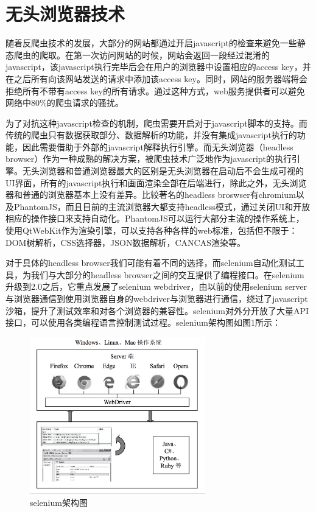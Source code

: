 \documentclass[doctor,privacy,twoside]{buaa_mac}
\begin{document}
\section{无头浏览器技术}
随着反爬虫技术的发展，大部分的网站都通过开启javascript的检查来避免一些静态爬虫的爬取。在第一次访问网站的时候，网站会返回一段经过混淆的javascript，该javascript执行完毕后会在用户的浏览器中设置相应的access key，并在之后所有向该网站发送的请求中添加该access key。同时，网站的服务器端将会拒绝所有不带有access key的所有请求。通过这种方式，web服务提供者可以避免网络中80\%的爬虫请求的骚扰。

为了对抗这种javascript检查的机制，爬虫需要开启对于javascript脚本的支持。而传统的爬虫只有数据获取部分、数据解析的功能，并没有集成javascript执行的功能，因此需要借助于外部的javascript解释执行引擎。而无头浏览器（headless browser）作为一种成熟的解决方案，被爬虫技术广泛地作为javascript的执行引擎。无头浏览器和普通浏览器最大的区别是无头浏览器在启动后不会生成可视的UI界面，所有的javascript执行和画面渲染全部在后端进行，除此之外，无头浏览器和普通的浏览器基本上没有差异。比较著名的headless broswser有chromium以及PhantomJS，而且目前的主流浏览器大都支持headless模式，通过关闭UI和开放相应的操作接口来支持自动化。PhantomJS可以运行大部分主流的操作系统上，使用QtWebKit作为渲染引擎，可以支持各种各样的web标准，包括但不限于：DOM树解析，CSS选择器，JSON数据解析，CANCAS渲染等。

对于具体的headless browser我们可能有着不同的选择，而selenium自动化测试工具，为我们与大部分的headless browser之间的交互提供了编程接口。在selenium升级到2.0之后，它重点发展了selenium webdriver，由以前的使用selenium server与浏览器通信到使用浏览器自身的webdriver与浏览器进行通信，绕过了javascript沙箱，提升了测试效率和对各个浏览器的兼容性。selenium对外分开放了大量API接口，可以使用各类编程语言控制测试过程。selenium架构图如图1所示：


\centerline{}
\begin{figure}[!h]
  \centering
  \includegraphics[width=0.68\textwidth]{images/selenium.png}
  \caption{selenium架构图}
  \label{fig:logo}
\end{figure}
\centerline{}
\end{document}
